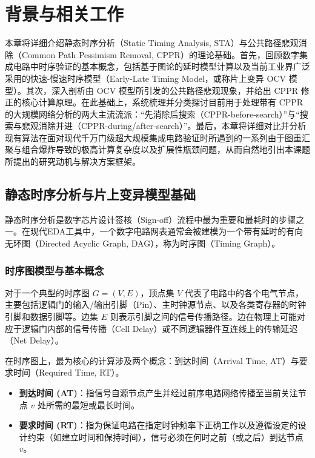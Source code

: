 \chapter{背景与相关工作}
\label{chap:background}

本章将详细介绍静态时序分析（Static Timing Analysis, STA）与公共路径悲观消除（Common Path Pessimism Removal, CPPR）的理论基础。首先，回顾数字集成电路中时序验证的基本概念，包括基于图论的延时模型计算以及当前工业界广泛采用的快速-慢速时序模型（Early-Late Timing Model，或称片上变异 OCV 模型）。其次，深入剖析由 OCV 模型所引发的公共路径悲观现象，并给出 CPPR 修正的核心计算原理。在此基础上，系统梳理并分类探讨目前用于处理带有 CPPR 的大规模网络分析的两大主流流派：“先消除后搜索（CPPR-before-search）”与“搜索与悲观消除并进（CPPR-during/after-search）”。最后，本章将详细对比并分析现有算法在面对现代千万门级超大规模集成电路验证时所遇到的一系列由于图重汇聚与组合爆炸导致的极高计算复杂度以及扩展性瓶颈问题，从而自然地引出本课题所提出的研究动机与解决方案框架。

\section{静态时序分析与片上变异模型基础}
\label{sec:sta_basics}

静态时序分析是数字芯片设计签核（Sign-off）流程中最为重要和最耗时的步骤之一。在现代EDA工具中，一个数字电路网表通常会被建模为一个带有延时的有向无环图（Directed Acyclic Graph, DAG），称为时序图（Timing Graph）。

\subsection{时序图模型与基本概念}
对于一个典型的时序图 $G = (V, E)$，顶点集 $V$ 代表了电路中的各个电气节点，主要包括逻辑门的输入/输出引脚（Pin）、主时钟源节点、以及各类寄存器的时钟引脚和数据引脚等。边集 $E$ 则表示引脚之间的信号传播路径。边在物理上可能对应于逻辑门内部的信号传播（Cell Delay）或不同逻辑器件互连线上的传输延迟（Net Delay）。

在时序图上，最为核心的计算涉及两个概念：到达时间（Arrival Time, AT）与要求时间（Required Time, RT）。
\begin{itemize}
    \item \textbf{到达时间 (AT)}：指信号自源节点产生并经过前序电路网络传播至当前关注节点 $v$ 处所需的最短或最长时间。
    \item \textbf{要求时间 (RT)}：指为保证电路在指定时钟频率下正确工作以及遵循设定的设计约束（如建立时间和保持时间），信号必须在何时之前（或之后）到达节点 $v$。
\end{itemize}

